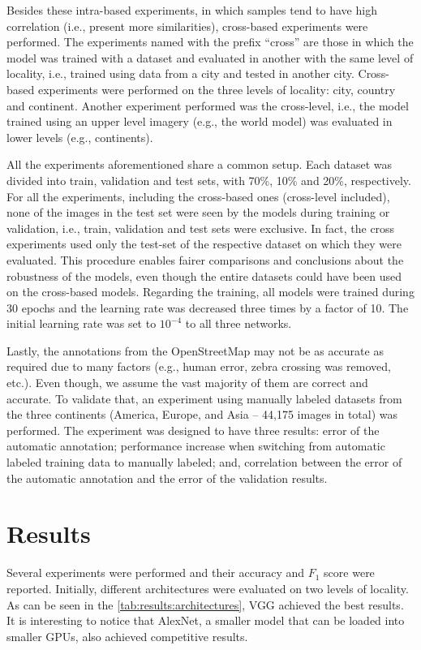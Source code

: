\documentclass[journal]{IEEEtran}
\newcommand{\OpenStreetMap}{OpenStreetMap\xspace}
\begin{document}
Besides these intra-based experiments, in which samples tend to have high correlation (i.e., present more similarities), cross-based experiments were performed. The experiments named with the prefix ``cross'' are those in which the model was trained with a dataset and evaluated in another with the same level of locality, i.e., trained using data from a city and tested in another city. Cross-based experiments were performed on the three levels of locality: city, country and continent. Another experiment performed was the cross-level, i.e., the model trained using an upper level imagery (e.g., the world model) was evaluated in lower levels (e.g., continents).

All the experiments aforementioned share a common setup. Each dataset was divided into train, validation and test sets, with 70\%, 10\% and 20\%, respectively. For all the experiments, including the cross-based ones (cross-level included), none of the images in the test set were seen by the models during training or validation, i.e., train, validation and test sets were exclusive. In fact, the cross experiments used only the test-set of the respective dataset on which they were evaluated. This procedure enables fairer comparisons and conclusions about the robustness of the models, even though the entire datasets could have been used on the cross-based models. Regarding the training, all models were trained during 30 epochs and the learning rate was decreased three times by a factor of 10. The initial learning rate was set to $10^{-4}$ to all three networks.

Lastly, the annotations from the \OpenStreetMap may not be as accurate as required due to many factors (e.g., human error, zebra crossing was removed, etc.). Even though, we assume the vast majority of them are correct and accurate. To validate that, an experiment using manually labeled datasets from the three continents (America, Europe, and Asia -- 44,175 images in total) was performed. The experiment was designed to have three results: error of the automatic annotation; performance increase when switching from automatic labeled training data to manually labeled; and, correlation between the error of the automatic annotation and the error of the validation results.

\section{Results}

Several experiments were performed and their accuracy and $F_1$ score were reported. Initially, different architectures were evaluated on two levels of locality. As can be seen in the \autoref{tab:results:architectures}, VGG achieved the best results. It is interesting to notice that AlexNet, a smaller model that can be loaded into smaller GPUs, also achieved competitive results.
\end{document}
